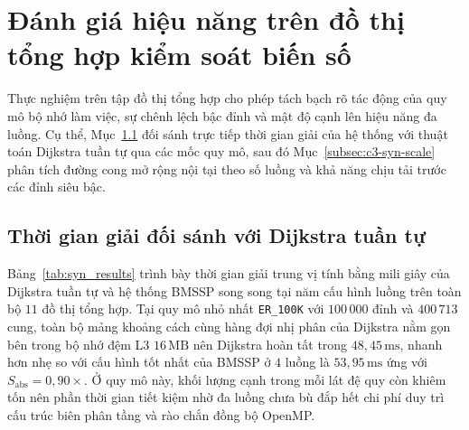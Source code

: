 \section{Đánh giá hiệu năng trên đồ thị tổng hợp kiểm soát biến số}\label{sec:c3-synthetic}

Thực nghiệm trên tập đồ thị tổng hợp cho phép tách bạch rõ tác động của quy mô bộ nhớ làm việc, sự chênh lệch bậc đỉnh và mật độ cạnh lên hiệu năng đa luồng. Cụ thể, Mục~\ref{subsec:c3-syn-time} đối sánh trực tiếp thời gian giải của hệ thống với thuật toán Dijkstra tuần tự qua các mốc quy mô, sau đó Mục~\ref{subsec:c3-syn-scale} phân tích đường cong mở rộng nội tại theo số luồng và khả năng chịu tải trước các đỉnh siêu bậc.

\subsection{Thời gian giải đối sánh với Dijkstra tuần tự}\label{subsec:c3-syn-time}

Bảng~\ref{tab:syn_results} trình bày thời gian giải trung vị tính bằng mili giây của Dijkstra tuần tự và hệ thống BMSSP song song tại năm cấu hình luồng trên toàn bộ $11$ đồ thị tổng hợp. Tại quy mô nhỏ nhất \texttt{ER\_100K} với $100\,000$ đỉnh và $400\,713$ cung, toàn bộ mảng khoảng cách cùng hàng đợi nhị phân của Dijkstra nằm gọn bên trong bộ nhớ đệm L3 $16\,\mathrm{MB}$ nên Dijkstra hoàn tất trong $48{,}45\,\mathrm{ms}$, nhanh hơn nhẹ so với cấu hình tốt nhất của BMSSP ở $4$ luồng là $53{,}95\,\mathrm{ms}$ ứng với $S_{\mathrm{abs}} = 0{,}90\times$. Ở quy mô này, khối lượng cạnh trong mỗi lát đệ quy còn khiêm tốn nên phần thời gian tiết kiệm nhờ đa luồng chưa bù đắp hết chi phí duy trì cấu trúc biên phân tầng và rào chắn đồng bộ OpenMP.

